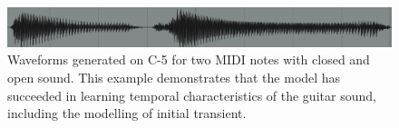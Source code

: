 \documentclass{article}
\begin{document}
\begin{sloppy}
\begin{figure}[t]
  \centering
  \centerline{\includegraphics[scale=0.32]{generated_waveform}}
  \caption{Waveforms generated on C-5 for two MIDI notes with closed and open sound. This example demonstrates that the model has succeeded in learning temporal characteristics of the guitar sound, including the modelling of initial transient.}
  \label{fig:generated_waveform}
\end{figure}




% 


{\footnotesize}

% 

\end{sloppy}
\end{document}
